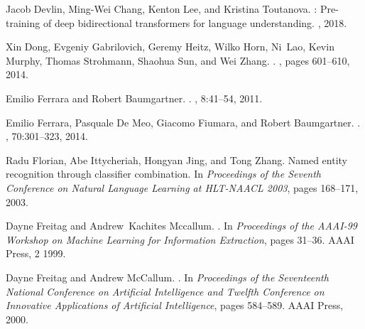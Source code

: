 \documentclass{nle}
\begin{document}
\begin{thebibliography}{}
Jacob Devlin, Ming-Wei Chang, Kenton Lee, and Kristina Toutanova.
: Pre-training of deep bidirectional transformers for language
  understanding.
, 2018.

Xin Dong, Evgeniy Gabrilovich, Geremy Heitz, Wilko Horn, Ni~Lao, Kevin Murphy,
  Thomas Strohmann, Shaohua Sun, and Wei Zhang.
.
, pages 601--610, 2014.

Emilio Ferrara and Robert Baumgartner.
.
, 8:41--54, 2011.

Emilio Ferrara, Pasquale {De Meo}, Giacomo Fiumara, and Robert Baumgartner.
.
, 70:301--323, 2014.

Radu Florian, Abe Ittycheriah, Hongyan Jing, and Tong Zhang.
\newblock Named entity recognition through classifier combination.
\newblock In {\em Proceedings of the Seventh Conference on Natural Language
  Learning at HLT-NAACL 2003}, pages 168--171, 2003.

Dayne Freitag and Andrew~Kachites Mccallum.
.
\newblock In {\em Proceedings of the AAAI-99 Workshop on Machine Learning for
  Information Extraction}, pages 31--36. AAAI Press, 2 1999.

Dayne Freitag and Andrew McCallum.
.
\newblock In {\em Proceedings of the Seventeenth National Conference on
  Artificial Intelligence and Twelfth Conference on Innovative Applications of
  Artificial Intelligence}, pages 584--589. AAAI Press, 2000.


\end{thebibliography}
\end{document}
